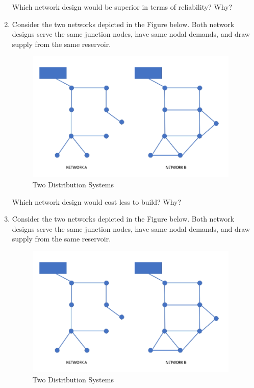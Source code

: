 \documentclass[12pt]{article}
\begin{document}
\begin{enumerate}
Which network design would be superior in terms of reliability? Why? \\

\clearpage

\item Consider the two networks depicted in the Figure below. Both network designs serve the same junction nodes, have same nodal demands, and draw supply from the same reservoir.

\begin{figure}[htbp] %
   \centering
   \includegraphics[width=4in]{Distribution.png} 
   \caption{Two Distribution Systems}
   \label{fig:placeholder1}
\end{figure}

Which network design would cost less to build? Why?  \\

\item Consider the two networks depicted in the Figure below. Both network designs serve the same junction nodes, have same nodal demands, and draw supply from the same reservoir.

\begin{figure}[htbp] %
   \centering
   \includegraphics[width=4in]{Distribution.png} 
   \caption{Two Distribution Systems}
   \label{fig:placeholder2}
\end{figure}


\end{enumerate}
\end{document}
